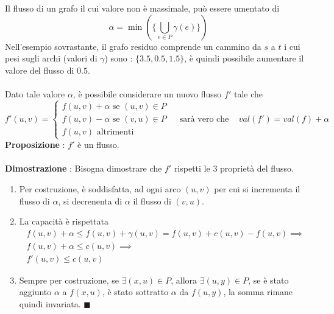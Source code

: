 \documentclass[12pt, letterpaper]{article}
\newcommand{\acc}{\\\hphantom{}\\}
\begin{document}
Il flusso di un grafo il cui valore non è massimale, può essere umentato di
 $$\alpha = \min(\{\bigcup_{e\in P}\gamma(e)\})$$
 Nell'esempio sovrastante, il grafo residuo comprende un cammino da $s$ a $t$ i cui pesi sugli archi (valori 
 di $\gamma$) sono : $\{3.5,0.5,1.5\}$, è quindi possibile aumentare il valore del flusso di $0.5$.\acc 
 Dato tale valore $\alpha$, è possibile considerare un nuovo flusso $f'$ tale che 
 $$ 
f'(u,v)=\begin{cases}
    f(u,v)+\alpha \text{ se }(u,v)\in P \\
    f(u,v)-\alpha \text{ se }(v,u)\in P\\
    f(u,v) \text{ altrimenti}
\end{cases}\;\;\;\text{ sarà vero che }\;\;\;val(f')=val(f)+\alpha
 $$
 \textbf{Proposizione} : $f'$ è un flusso.\acc
 \textbf{Dimostrazione} : Bisogna dimostrare che $f'$ rispetti le 3 proprietà del flusso. \begin{enumerate}
    \item Per costruzione, è soddisfatta, ad ogni arco $(u,v)$ per cui si incrementa il flusso di $\alpha$, si decrenenta 
    di $\alpha$ il flusso di $(v,u)$.
    \item La capacità è rispettata$$\begin{matrix}
        f(u,v)+\alpha \le f(u,v)+\gamma(u,v)=f(u,v)+c(u,v)-f(u,v)\implies \\ f(u,v)+\alpha \le c(u,v) 
        \implies \\f'(u,v) \le c(u,v) 
    \end{matrix}$$
    \item Sempre per costruzione, se $\exists (x,u)\in P$, allora $\exists(u,y)\in P$, se è stato aggiunto 
    $\alpha$ a $f(x,u)$, è stato sottratto $\alpha$ da $f(u,y)$, la somma rimane quindi invariata. $\blacksquare$
 \end{enumerate}
\end{document}
